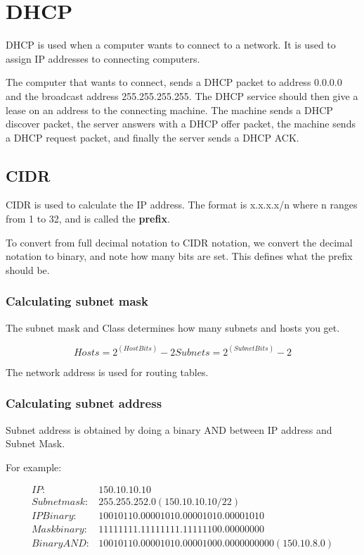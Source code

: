 \section{DHCP}
DHCP is used when a computer wants to connect to a network. It is used
to assign IP addresses to connecting computers.

The computer that wants to connect, sends a DHCP packet to address
0.0.0.0 and the broadcast address 255.255.255.255. The DHCP service
should then give a lease on an address to the connecting
machine. The machine sends a DHCP discover packet, the server answers
with a DHCP offer packet, the machine sends a DHCP request packet, and
finally the server sends a DHCP ACK.

\subsection{CIDR}
CIDR is used to calculate the IP address. The format is x.x.x.x/n
where n ranges from 1 to 32, and is called the \textbf{prefix}.

To convert from full decimal notation to CIDR notation, we convert the
decimal notation to binary, and note how many bits are set. This
defines what the prefix should be.

\subsubsection{Calculating subnet mask}
The subnet mask and Class determines how many subnets and hosts you get.

\[Hosts = 2^(HostBits)-2
    Subnets = 2^(SubnetBits)-2
\]

The network address is used for routing tables.

\subsubsection{Calculating subnet address}
Subnet address is obtained by doing a binary AND between IP address and Subnet Mask.

For example:

\begin{align*}
    IP:          &150.10.10.10\\
    Subnet mask: &255.255.252.0 (150.10.10.10/22)\\
    IP Binary:   &10010110.00001010.00001010.00001010\\
    Mask binary: &11111111.11111111.11111100.00000000\\
    Binary AND:  &10010110.00001010.00001000.0000000000 (150.10.8.0)
\end{align*}

